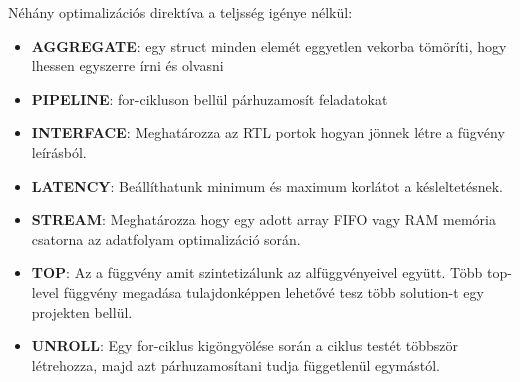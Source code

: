 \documentclass{article}
\begin{document}
Néhány optimalizációs direktíva a teljsség igénye nélkül:
\begin{itemize}
    \item \textbf{AGGREGATE}: egy struct minden elemét eggyetlen vekorba tömöríti, hogy lhessen egyszerre írni és olvasni
    \item \textbf{PIPELINE}: for-cikluson bellül párhuzamosít feladatokat
    \item \textbf{INTERFACE}: Meghatározza az RTL portok hogyan jönnek létre a fügvény leírásból.
    \item \textbf{LATENCY}: Beállíthatunk minimum és maximum korlátot a késleltetésnek.
    \item \textbf{STREAM}: Meghatározza hogy egy adott array FIFO vagy RAM memória csatorna az adatfolyam optimalizáció során. 
    \item \textbf{TOP}: Az a függvény amit szintetizálunk az alfüggvényeivel együtt. Több top-level függvény megadása tulajdonképpen lehetővé tesz több solution-t egy projekten bellül.
    \item \textbf{UNROLL}: Egy for-ciklus kigöngyölése során a ciklus testét többször létrehozza, majd azt párhuzamosítani tudja függetlenül egymástól.
\end{itemize}
\end{document}
